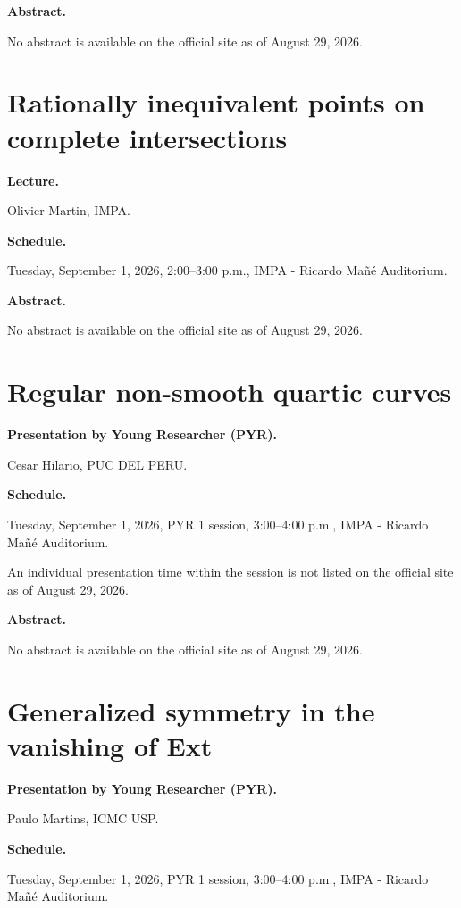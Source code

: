 \medskip\noindent
{\bf Abstract.}

No abstract is available on the official
site as of August 29, 2026.

\section{Rationally inequivalent points on
complete intersections}
\label{section-inequivalent-points}

\medskip\noindent
{\bf Lecture.}

Olivier Martin,
IMPA.

\medskip\noindent
{\bf Schedule.}

Tuesday, September 1, 2026,
2:00--3:00 p.m.,
IMPA - Ricardo Ma\~n\'e Auditorium.

\medskip\noindent
{\bf Abstract.}

No abstract is available on the official
site as of August 29, 2026.

\section{Regular non-smooth quartic curves}
\label{section-regular-nonsmooth-quartics}

\medskip\noindent
{\bf Presentation by Young Researcher
(PYR).}

Cesar Hilario,
PUC DEL PERU.

\medskip\noindent
{\bf Schedule.}

Tuesday, September 1, 2026,
PYR 1 session, 3:00--4:00 p.m.,
IMPA - Ricardo Ma\~n\'e Auditorium.

An individual presentation time within
the session is not listed on the
official site as of August 29, 2026.

\medskip\noindent
{\bf Abstract.}

No abstract is available on the official
site as of August 29, 2026.

\section{Generalized symmetry in the
vanishing of Ext}
\label{section-generalized-symmetry-ext}

\medskip\noindent
{\bf Presentation by Young Researcher
(PYR).}

Paulo Martins,
ICMC USP.

\medskip\noindent
{\bf Schedule.}

Tuesday, September 1, 2026,
PYR 1 session, 3:00--4:00 p.m.,
IMPA - Ricardo Ma\~n\'e Auditorium.


